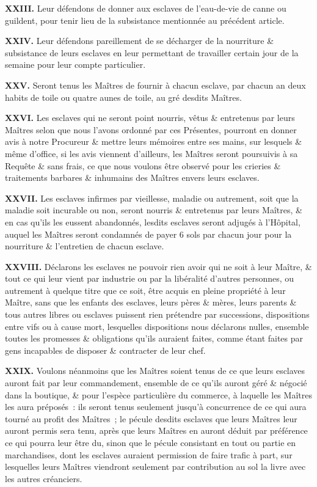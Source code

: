 \documentclass[french,twoside]{book} %
\newcommand{\labelchar}[1]{\textbf{\color{rubric} #1}}
\begin{document}
\labelchar{XXIII.} Leur défendons de donner aux esclaves de l’eau-de-vie de canne ou guildent, pour tenir lieu de la subsistance mentionnée au précédent article.\par
\labelchar{XXIV.} Leur défendons pareillement de se décharger de la nourriture \& subsistance de leurs esclaves en leur permettant de travailler certain jour de la semaine pour leur compte particulier.\par
\labelchar{XXV.} Seront tenus les Maîtres de fournir à chacun esclave, par chacun an deux habits de toile ou quatre aunes de toile, au gré desdits Maîtres.\par
\labelchar{XXVI.} Les esclaves qui ne seront point nourris, vêtus \& entretenus par leurs Maîtres selon que nous l’avons ordonné par ces Présentes, pourront en donner avis à notre Procureur \& mettre leurs mémoires entre ses mains, sur lesquels \& même d’office, si les avis viennent d’ailleurs, les Maîtres seront poursuivis à sa Requête \& sans frais, ce que nous voulons être observé pour les crieries \& traitements barbares \& inhumains des Maîtres envers leurs esclaves.\par
\labelchar{XXVII.} Les esclaves infirmes par vieillesse, maladie ou autrement, soit que la maladie soit incurable ou non, seront nourris \& entretenus par leurs Maîtres, \& en cas qu’ils les eussent abandonnés, lesdits esclaves seront adjugés à l’Hôpital, auquel les Maîtres seront condamnés de payer 6 sols par chacun jour pour la nourriture \& l’entretien de chacun esclave.\par
\labelchar{XXVIII.} Déclarons les esclaves ne pouvoir rien avoir qui ne soit à leur Maître, \& tout ce qui leur vient par industrie ou par la libéralité d’autres personnes, ou autrement à quelque titre que ce soit, être acquis en pleine propriété à leur Maître, sans que les enfants des esclaves, leurs pères \& mères, leurs parents \& tous autres libres ou esclaves puissent rien prétendre par successions, dispositions entre vifs ou à cause mort, lesquelles dispositions nous déclarons nulles, ensemble toutes les promesses \& obligations qu’ils auraient faites, comme étant faites par gens incapables de disposer \& contracter de leur chef.\par
\labelchar{XXIX.} Voulons néanmoins que les Maîtres soient tenus de ce que leurs esclaves auront fait par leur commandement, ensemble de ce qu’ils auront géré \& négocié dans la boutique, \& pour l’espèce particulière du commerce, à laquelle les Maîtres les aura préposés : ils seront tenus seulement jusqu’à concurrence de ce qui aura tourné au profit des Maîtres ; le pécule desdits esclaves que leurs Maîtres leur auront permis sera tenu, après que leurs Maîtres en auront déduit par préférence ce qui pourra leur être du, sinon que le pécule consistant en tout ou partie en marchandises, dont les esclaves auraient permission de faire trafic à part, sur lesquelles leurs Maîtres viendront seulement par contribution au sol la livre avec les autres créanciers.\par
\end{document}
